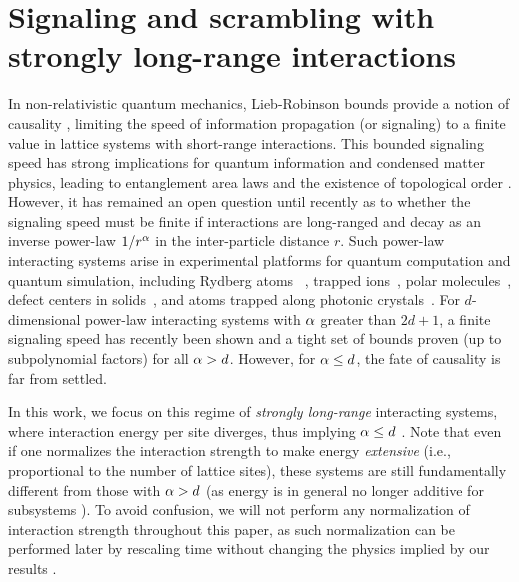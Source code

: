 \chapter{Signaling and scrambling with strongly long-range interactions}
\label{ch:vlr}
In non-relativistic quantum mechanics, Lieb-Robinson bounds provide a notion of causality \cite{LR}, limiting the speed of information propagation (or signaling) to a finite value in lattice systems with short-range interactions. This bounded signaling speed has strong implications for quantum information and condensed matter physics, leading to entanglement area laws \cite{Hastings2007} and the existence of topological order \cite{Bravyi2010}.
However, it has remained an open question until recently as to whether the signaling speed must be finite if interactions are long-ranged and decay as an inverse power-law $1/r^{\alpha}$ in the inter-particle distance $r$.
Such power-law interacting systems arise in experimental platforms for quantum computation and quantum simulation, including Rydberg atoms ~\cite{Saffman2010}, trapped ions~\cite{Britton2012}, polar molecules~\cite{Yan2013}, defect centers in solids~\cite{Yao2012}, and atoms trapped along photonic crystals~\cite{Douglas15}.
For $d$-dimensional power-law interacting systems with $\alpha$ greater than $2d+1$, a finite signaling speed has recently been shown \cite{Chen2019,kuwaharaStrictlyLinearLight2020} and a tight set of bounds proven (up to subpolynomial factors) for all $\alpha > d$.
However, for $\alpha \le d$, the fate of causality is far from settled.


In this work, we focus on this regime of \emph{strongly long-range} interacting systems, where interaction energy per site diverges, thus implying $\alpha\le d$ \cite{Kastner11,Kastner12, Storch15, Kastner17}.
Note that even if one normalizes the interaction strength to make energy \emph{extensive} (i.e., proportional to the number of lattice sites), these systems are still fundamentally different from those with $\alpha >d$ (as energy is in general no longer additive for subsystems \cite{Dauxois}).
To avoid confusion, we will not perform any normalization of interaction strength throughout this paper, as such normalization can be performed later by rescaling time  without changing the physics implied by our results \cite{Storch15}.

